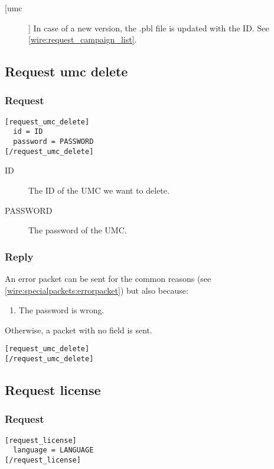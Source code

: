 \begin{description}
  \item [[umc]] In case of a new version, the .pbl file is updated with the ID. See \cref{wire:request_campaign_list}.
\end{description}

\subsection{Request umc delete}
\label{wire:request_umc_delete}

\subsubsection{Request}
\begin{lstlisting}
[request_umc_delete]
  id = ID
  password = PASSWORD
[/request_umc_delete]
\end{lstlisting}
\begin{description}
  \item [ID] The ID of the UMC we want to delete.
  \item [PASSWORD] The password of the UMC.
\end{description}

\subsubsection{Reply}

An error packet can be sent for the common reasons (see \cref{wire:specialpackets:errorpacket}) but also because:
\begin{enumerate}
 \item The password is wrong.
\end{enumerate}

Otherwise, a packet with no field is sent.
\begin{lstlisting}
[request_umc_delete]
[/request_umc_delete]
\end{lstlisting}

\subsection{Request license}
\label{wire:request_license}

\subsubsection{Request}
\begin{lstlisting}
[request_license]
  language = LANGUAGE
[/request_license]
\end{lstlisting}

